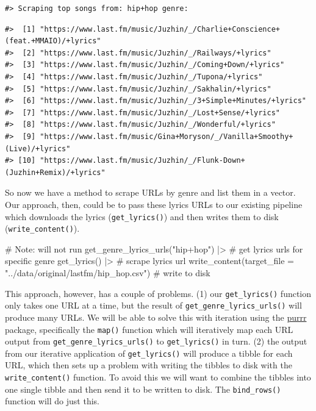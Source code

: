 \documentclass[
  letterpaper,
]{latex/krantz}
\newenvironment{Shaded}{\begin{snugshade}}{\end{snugshade}}
\newcommand{\AttributeTok}[1]{\textcolor[rgb]{0.40,0.45,0.13}{#1}}
\newcommand{\CommentTok}[1]{\textcolor[rgb]{0.37,0.37,0.37}{#1}}
\newcommand{\FunctionTok}[1]{\textcolor[rgb]{0.28,0.35,0.67}{#1}}
\newcommand{\NormalTok}[1]{\textcolor[rgb]{0.00,0.23,0.31}{#1}}
\newcommand{\SpecialCharTok}[1]{\textcolor[rgb]{0.37,0.37,0.37}{#1}}
\newcommand{\StringTok}[1]{\textcolor[rgb]{0.13,0.47,0.30}{#1}}
\begin{document}
\begin{verbatim}
#> Scraping top songs from: hip+hop genre:
\end{verbatim}

\begin{verbatim}
#>  [1] "https://www.last.fm/music/Juzhin/_/Charlie+Conscience+(feat.+MMAIO)/+lyrics"
#>  [2] "https://www.last.fm/music/Juzhin/_/Railways/+lyrics"                        
#>  [3] "https://www.last.fm/music/Juzhin/_/Coming+Down/+lyrics"                     
#>  [4] "https://www.last.fm/music/Juzhin/_/Tupona/+lyrics"                          
#>  [5] "https://www.last.fm/music/Juzhin/_/Sakhalin/+lyrics"                        
#>  [6] "https://www.last.fm/music/Juzhin/_/3+Simple+Minutes/+lyrics"                
#>  [7] "https://www.last.fm/music/Juzhin/_/Lost+Sense/+lyrics"                      
#>  [8] "https://www.last.fm/music/Juzhin/_/Wonderful/+lyrics"                       
#>  [9] "https://www.last.fm/music/Gina+Moryson/_/Vanilla+Smoothy+(Live)/+lyrics"    
#> [10] "https://www.last.fm/music/Juzhin/_/Flunk-Down+(Juzhin+Remix)/+lyrics"
\end{verbatim}

So now we have a method to scrape URLs by genre and list them in a
vector. Our approach, then, could be to pass these lyrics URLs to our
existing pipeline which downloads the lyrics (\texttt{get\_lyrics()})
and then writes them to disk (\texttt{write\_content()}).

\begin{Shaded}
\begin{Highlighting}[]
\CommentTok{\# Note: will not run}
\FunctionTok{get\_genre\_lyrics\_urls}\NormalTok{(}\StringTok{"hip+hop"}\NormalTok{) }\SpecialCharTok{|\textgreater{}} \CommentTok{\# get lyrics urls for specific genre}
  \FunctionTok{get\_lyrics}\NormalTok{() }\SpecialCharTok{|\textgreater{}} \CommentTok{\# scrape lyrics url}
  \FunctionTok{write\_content}\NormalTok{(}\AttributeTok{target\_file =} \StringTok{"../data/original/lastfm/hip\_hop.csv"}\NormalTok{) }\CommentTok{\# write to disk}
\end{Highlighting}
\end{Shaded}

This approach, however, has a couple of problems. (1) our
\texttt{get\_lyrics()} function only takes one URL at a time, but the
result of \texttt{get\_genre\_lyrics\_urls()} will produce many URLs. We
will be able to solve this with iteration using the \href{}{purrr}
package, specifically the \texttt{map()} function which will iteratively
map each URL output from \texttt{get\_genre\_lyrics\_urls()} to
\texttt{get\_lyrics()} in turn. (2) the output from our iterative
application of \texttt{get\_lyrics()} will produce a tibble for each
URL, which then sets up a problem with writing the tibbles to disk with
the \texttt{write\_content()} function. To avoid this we will want to
combine the tibbles into one single tibble and then send it to be
written to disk. The \texttt{bind\_rows()} function will do just this.
\end{document}
